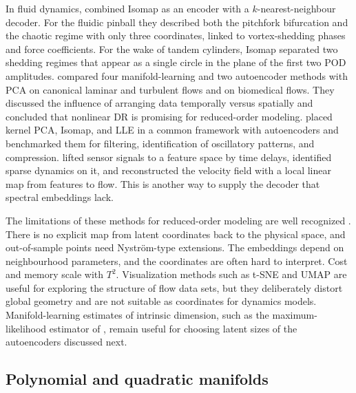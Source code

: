 In fluid dynamics, \textcite{farzamnik2023snapshots} combined Isomap as an
encoder with a $k$-nearest-neighbour decoder. For the fluidic pinball they
described both the pitchfork bifurcation and the chaotic regime with only
three coordinates, linked to vortex-shedding phases and force coefficients.
For the wake of tandem cylinders, Isomap separated two shedding regimes that
appear as a single circle in the plane of the first two POD amplitudes.
\textcite{csala2022comparing} compared four manifold-learning and two
autoencoder methods with PCA on canonical laminar and turbulent flows and on
biomedical flows. They discussed the influence of arranging data temporally
versus spatially and concluded that nonlinear DR is promising for reduced-order
modeling. \textcite{mendez2023linear} placed kernel PCA, Isomap, and LLE in a
common framework with autoencoders and benchmarked them for filtering,
identification of oscillatory patterns, and compression.
\textcite{loiseau2018sparse} lifted sensor signals to a feature space by time
delays, identified sparse dynamics on it, and reconstructed the velocity field
with a local linear map from features to flow. This is another way to supply
the decoder that spectral embeddings lack.

The limitations of these methods for reduced-order modeling are well
recognized \parencite{mojgani2021registration}. There is no explicit map from
latent coordinates back to the physical space, and out-of-sample points need
Nystr\"om-type extensions. The embeddings depend on neighbourhood parameters,
and the coordinates are often hard to interpret. Cost and memory scale with
$T^{2}$. Visualization methods such as t-SNE \parencite{vandermaaten2008tsne}
and UMAP \parencite{mcinnes2018umap} are useful for exploring the structure of
flow data sets, but they deliberately distort global geometry and are not
suitable as coordinates for dynamics models. Manifold-learning estimates of
intrinsic dimension, such as the maximum-likelihood estimator of
\textcite{levina2004intrinsic}, remain useful for choosing latent sizes of the
autoencoders discussed next.

\subsection{Polynomial and quadratic manifolds}

